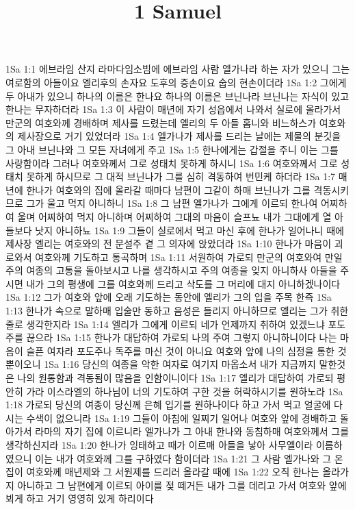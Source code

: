 

\title{1 Samuel}

1Sa 1:1  에브라임 산지 라마다임소빔에 에브라임 사람 엘가나라 하는 자가 있으니 그는 여로함의 아들이요 엘리후의 손자요 도후의 증손이요 숩의 현손이더라
1Sa 1:2  그에게 두 아내가 있으니 하나의 이름은 한나요 하나의 이름은 브닌나라 브닌나는 자식이 있고 한나는 무자하더라
1Sa 1:3  이 사람이 매년에 자기 성읍에서 나와서 실로에 올라가서 만군의 여호와께 경배하며 제사를 드렸는데 엘리의 두 아들 홉니와 비느하스가 여호와의 제사장으로 거기 있었더라
1Sa 1:4  엘가나가 제사를 드리는 날에는 제물의 분깃을 그 아내 브닌나와 그 모든 자녀에게 주고
1Sa 1:5  한나에게는 갑절을 주니 이는 그를 사랑함이라 그러나 여호와께서 그로 성태치 못하게 하시니
1Sa 1:6  여호와께서 그로 성태치 못하게 하시므로 그 대적 브닌나가 그를 심히 격동하여 번민케 하더라
1Sa 1:7  매년에 한나가 여호와의 집에 올라갈 때마다 남편이 그같이 하매 브닌나가 그를 격동시키므로 그가 울고 먹지 아니하니
1Sa 1:8  그 남편 엘가나가 그에게 이르되 한나여 어찌하여 울며 어찌하여 먹지 아니하며 어찌하여 그대의 마음이 슬프뇨 내가 그대에게 열 아들보다 낫지 아니하뇨
1Sa 1:9  그들이 실로에서 먹고 마신 후에 한나가 일어나니 때에 제사장 엘리는 여호와의 전 문설주 곁 그 의자에 앉았더라
1Sa 1:10  한나가 마음이 괴로와서 여호와께 기도하고 통곡하며
1Sa 1:11  서원하여 가로되 만군의 여호와여 만일 주의 여종의 고통을 돌아보시고 나를 생각하시고 주의 여종을 잊지 아니하사 아들을 주시면 내가 그의 평생에 그를 여호와께 드리고 삭도를 그 머리에 대지 아니하겠나이다
1Sa 1:12  그가 여호와 앞에 오래 기도하는 동안에 엘리가 그의 입을 주목 한즉
1Sa 1:13  한나가 속으로 말하매 입술만 동하고 음성은 들리지 아니하므로 엘리는 그가 취한 줄로 생각한지라
1Sa 1:14  엘리가 그에게 이르되 네가 언제까지 취하여 있겠느냐 포도주를 끊으라
1Sa 1:15  한나가 대답하여 가로되 나의 주여 그렇지 아니하니이다 나는 마음이 슬픈 여자라 포도주나 독주를 마신 것이 아니요 여호와 앞에 나의 심정을 통한 것뿐이오니
1Sa 1:16  당신의 여종을 악한 여자로 여기지 마옵소서 내가 지금까지 말한것은 나의 원통함과 격동됨이 많음을 인함이니이다
1Sa 1:17  엘리가 대답하여 가로되 평안히 가라 이스라엘의 하나님이 너의 기도하여 구한 것을 허락하시기를 원하노라
1Sa 1:18  가로되 당신의 여종이 당신께 은혜 입기를 원하나이다 하고 가서 먹고 얼굴에 다시는 수색이 없으니라
1Sa 1:19  그들이 아침에 일찌기 일어나 여호와 앞에 경배하고 돌아가서 라마의 자기 집에 이르니라 엘가나가 그 아내 한나와 동침하매 여호와께서 그를 생각하신지라
1Sa 1:20  한나가 잉태하고 때가 이르매 아들을 낳아 사무엘이라 이름하였으니 이는 내가 여호와께 그를 구하였다 함이더라
1Sa 1:21  그 사람 엘가나와 그 온 집이 여호와께 매년제와 그 서원제를 드리러 올라갈 때에
1Sa 1:22  오직 한나는 올라가지 아니하고 그 남편에게 이르되 아이를 젖 떼거든 내가 그를 데리고 가서 여호와 앞에 뵈게 하고 거기 영영히 있게 하리이다
